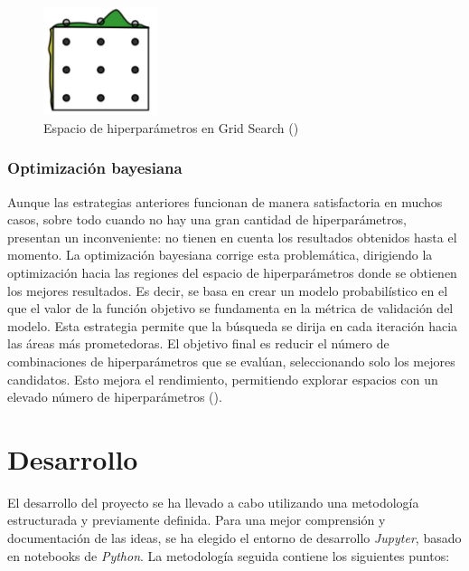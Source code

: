 \documentclass[12pt,a4paper]{report}
\begin{document}
\begin{figure}[H]
    \centering
    \includegraphics[width=0.3\textwidth]{Images/tfm-2.8.png}
    \caption{Espacio de hiperparámetros en Grid Search (\cite{gonzalezdorado2024ML})}
    \label{fig:GSearch}
\end{figure}

\subsection{Optimización bayesiana}

Aunque las estrategias anteriores funcionan de manera satisfactoria en muchos casos, sobre todo cuando no hay una gran cantidad de hiperparámetros, presentan un inconveniente: no tienen en cuenta los resultados obtenidos hasta el momento. La optimización bayesiana corrige esta problemática, dirigiendo la optimización hacia las regiones del espacio de hiperparámetros donde se obtienen los mejores resultados. Es decir, se basa en crear un modelo probabilístico en el que el valor de la función objetivo se fundamenta en la métrica de validación del modelo. Esta estrategia permite que la búsqueda se dirija en cada iteración hacia las áreas más prometedoras. El objetivo final es reducir el número de combinaciones de hiperparámetros que se evalúan, seleccionando solo los mejores candidatos. Esto mejora el rendimiento, permitiendo explorar espacios con un elevado número de hiperparámetros (\cite{amat2020optimizacion}).



\chapter{Desarrollo}\label{cap:cap4}

El desarrollo del proyecto se ha llevado a cabo utilizando una metodología estructurada y previamente definida. Para una mejor comprensión y documentación de las ideas, se ha elegido el entorno de desarrollo \textit{Jupyter}, basado en notebooks de \textit{Python}. La metodología seguida contiene los siguientes puntos:
\end{document}
